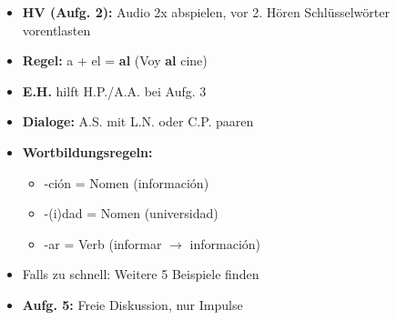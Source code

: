 \documentclass[11pt, a4paper]{article}
\begin{document}
\normalsize
\vspace{0.3cm}


\begin{minipage}[t]{0.48\textwidth}
\begin{tcolorbox}[
    colback=gruppeA!10,
    colframe=gruppeA,
    title={\footnotesize\bfseries Tipps Gruppe A},
    fonttitle=\bfseries,
    boxrule=0.5pt,
    top=2pt, bottom=2pt, left=4pt, right=4pt
]
\footnotesize
\begin{itemize}
\item \textbf{HV (Aufg. 2):} Audio 2x abspielen, vor 2. Hören Schlüsselwörter vorentlasten
\item \textbf{Regel:} a + el = \textbf{al} (Voy \textbf{al} cine)
\item \textbf{E.H.} hilft H.P./A.A. bei Aufg. 3
\item \textbf{Dialoge:} A.S. mit L.N. oder C.P. paaren
\end{itemize}
\end{tcolorbox}
\end{minipage}
\hfill
\begin{minipage}[t]{0.48\textwidth}
\begin{tcolorbox}[
    colback=gruppeB!10,
    colframe=gruppeB,
    title={\footnotesize\bfseries Tipps Gruppe B},
    fonttitle=\bfseries,
    boxrule=0.5pt,
    top=2pt, bottom=2pt, left=4pt, right=4pt
]
\footnotesize
\begin{itemize}
\item \textbf{Wortbildungsregeln:}
  \begin{itemize}
  \footnotesize
  \item -ción = Nomen (información)
  \item -(i)dad = Nomen (universidad)
  \item -ar = Verb (informar $\rightarrow$ información)
  \end{itemize}
\item Falls zu schnell: Weitere 5 Beispiele finden
\item \textbf{Aufg. 5:} Freie Diskussion, nur Impulse
\end{itemize}
\end{tcolorbox}
\end{minipage}

\vspace{0.3cm}
\end{document}
